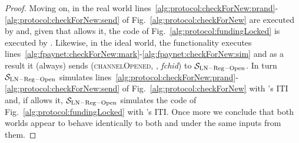 \begin{proof}
  Moving on, in the real world
  lines~\ref{alg:protocol:checkForNew:prand}-\ref{alg:protocol:checkForNew:send} of
  Fig.~\ref{alg:protocol:checkForNew} are executed by \alice{} and, given that
  \adversary{} allows it, the code of Fig.~\ref{alg:protocol:fundingLocked} is
  executed by \bob. Likewise, in the ideal world, the functionality executes
  lines~\ref{alg:fpaynet:checkForNew:mark}-\ref{alg:fpaynet:checkForNew:sim} and as
  a result it (always) sends (\textsc{channelOpened}, \alice, \textit{fchid})
  to $\mathcal{S}_{\mathrm{LN - Reg - Open}}$. In turn $\mathcal{S}_{\mathrm{LN -
  Reg - Open}}$ simulates
  lines~\ref{alg:protocol:checkForNew:prand}-\ref{alg:protocol:checkForNew:send} of
  Fig.~\ref{alg:protocol:checkForNew} with \alice's ITI and, if \adversary{}
  allows it, $\mathcal{S}_{\mathrm{LN - Reg - Open}}$ simulates the code of
  Fig.~\ref{alg:protocol:fundingLocked} with \bob's ITI. Once more we conclude
  that both worlds appear to behave identically to both \environment{} and
  \adversary{} under the same inputs from them.
\end{proof}
